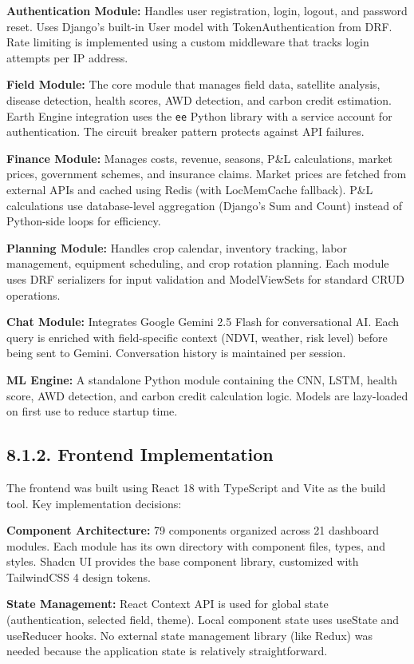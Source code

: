 \documentclass[12pt, a4paper]{report}
\begin{document}
\textbf{Authentication Module:} Handles user registration, login, logout, and password reset. Uses Django's built-in User model with TokenAuthentication from DRF. Rate limiting is implemented using a custom middleware that tracks login attempts per IP address.

\textbf{Field Module:} The core module that manages field data, satellite analysis, disease detection, health scores, AWD detection, and carbon credit estimation. Earth Engine integration uses the \texttt{ee} Python library with a service account for authentication. The circuit breaker pattern protects against API failures.

\textbf{Finance Module:} Manages costs, revenue, seasons, P\&L calculations, market prices, government schemes, and insurance claims. Market prices are fetched from external APIs and cached using Redis (with LocMemCache fallback). P\&L calculations use database-level aggregation (Django's Sum and Count) instead of Python-side loops for efficiency.

\textbf{Planning Module:} Handles crop calendar, inventory tracking, labor management, equipment scheduling, and crop rotation planning. Each module uses DRF serializers for input validation and ModelViewSets for standard CRUD operations.

\textbf{Chat Module:} Integrates Google Gemini 2.5 Flash for conversational AI. Each query is enriched with field-specific context (NDVI, weather, risk level) before being sent to Gemini. Conversation history is maintained per session.

\textbf{ML Engine:} A standalone Python module containing the CNN, LSTM, health score, AWD detection, and carbon credit calculation logic. Models are lazy-loaded on first use to reduce startup time.

\subsection{8.1.2. Frontend Implementation}
The frontend was built using React 18 with TypeScript and Vite as the build tool. Key implementation decisions:

\textbf{Component Architecture:} 79 components organized across 21 dashboard modules. Each module has its own directory with component files, types, and styles. Shadcn UI provides the base component library, customized with TailwindCSS 4 design tokens.

\textbf{State Management:} React Context API is used for global state (authentication, selected field, theme). Local component state uses useState and useReducer hooks. No external state management library (like Redux) was needed because the application state is relatively straightforward.
\end{document}
